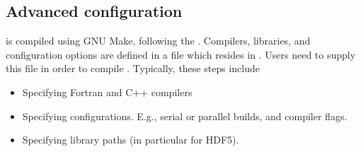 \documentclass[letterpaper,10pt,english]{sphinxmanual}
\begin{document}
\subsection{Advanced configuration}
\label{\detokenize{Base/GettingStarted:advanced-configuration}}
 is compiled using GNU Make, following the .
Compilers, libraries, and configuration options are defined in a file  which resides in .
Users need to supply this file in order to compile .
Typically, these steps include
\begin{itemize}
\item {} 
Specifying Fortran and C++ compilers

\item {} 
Specifying configurations. E.g., serial or parallel builds, and compiler flags.

\item {} 
Specifying library paths (in particular for HDF5).

\end{itemize}
\end{document}

